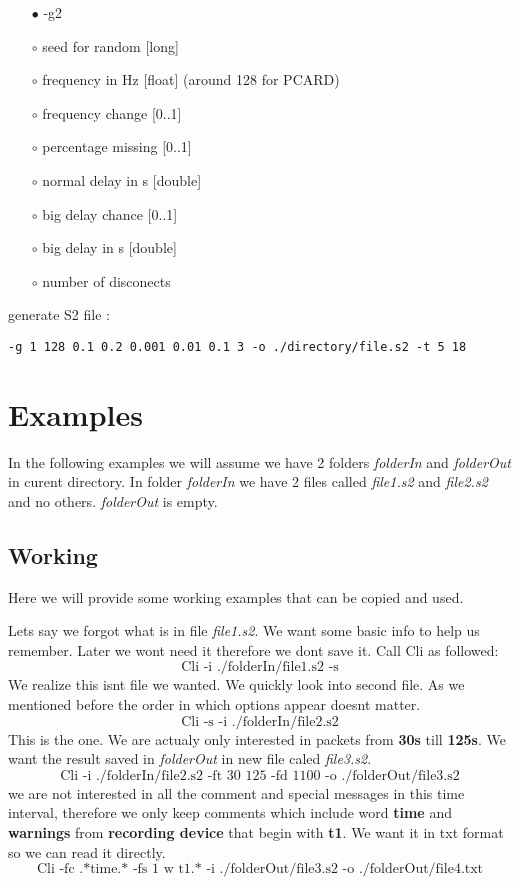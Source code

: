 \documentclass[english]{article}
\begin{document}
\begin{itemize}
\item[$\bullet$] -g2
\item[$\circ$] seed for random [long]
\item[$\circ$] frequency in Hz [float] (around 128 for PCARD)
\item[$\circ$] frequency change [0..1]
\item[$\circ$] percentage missing [0..1]
\item[$\circ$] normal delay in s [double]
\item[$\circ$] big delay chance [0..1]
\item[$\circ$] big delay in s [double]
\item[$\circ$] number of disconects

\end{itemize}
generate S2 file : 
\begin{lstlisting} 
-g 1 128 0.1 0.2 0.001 0.01 0.1 3 -o ./directory/file.s2 -t 5 18
\end{lstlisting}


\section{Examples}

In the following examples we will assume we have 2 folders \textit{folderIn} and \textit{folderOut} in curent directory. In folder \textit{folderIn} we have 2 files called \textit{file1.s2} and \textit{file2.s2} and no others. \textit{folderOut} is empty.

\subsection{Working}
Here we will provide some working examples that can be copied and used. 

Lets say we forgot what is in file \textit{file1.s2}. We want some basic info to help us remember. Later we wont need it therefore we dont save it. Call Cli as followed:
$$\text{Cli -i ./folderIn/file1.s2 -s}$$
We realize this isnt file we wanted. We quickly look into second file. As we mentioned before the order in which options appear doesnt matter.
$$\text{Cli -s -i ./folderIn/file2.s2}$$
This is the one. We are actualy only interested in packets from \textbf{30s} till \textbf{125s}. We want the result saved in \textit{folderOut} in new file caled \textit{file3.s2}.
$$\text{Cli -i ./folderIn/file2.s2 -ft 30 125 -fd 1100 -o ./folderOut/file3.s2}$$
we are not interested in all the comment and special messages in this time interval, therefore we only keep comments which include word \textbf{time} and \textbf{warnings} from \textbf{recording device} that begin with \textbf{t1}. We want it in txt format so we can read it directly.
$$\text{Cli -fc .*time.* -fs 1 w t1.* -i ./folderOut/file3.s2 -o ./folderOut/file4.txt}$$
\end{document}
